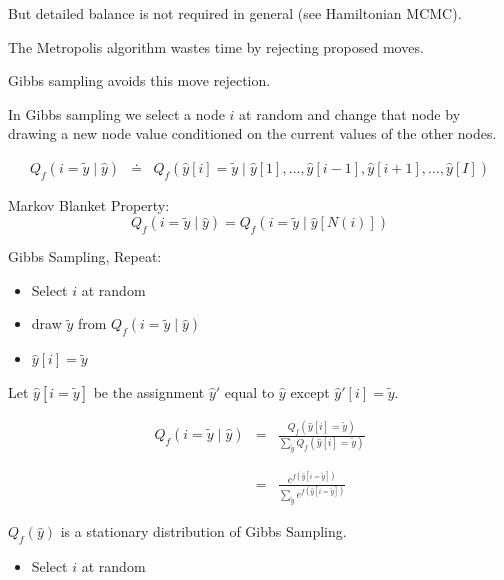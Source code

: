 {\vfill
But detailed balance is not required in general (see Hamiltonian MCMC).


The Metropolis algorithm wastes time by rejecting proposed moves.

\vfill
Gibbs sampling avoids this move rejection.

\vfill
In Gibbs sampling we select a node $i$ at random and change that node by drawing a new node value conditioned on the current values of the other nodes.


\begin{eqnarray*}
  Q_f(i=\tilde{y} \;|\;\hat{y}) & \doteq & Q_f(\hat{y}[i] = \tilde{y}\;|\;\hat{y}[1],\ldots,\hat{y}[i-1],\hat{y}[i+1],\ldots,\hat{y}[I])
\end{eqnarray*}

\vfill
Markov Blanket Property:
$$Q_f(i=\tilde{y} \;|\;\hat{y}) = Q_f(i=\tilde{y} \;|\;\hat{y}[N(i)])$$
  
\vfill
Gibbs Sampling, Repeat:

\begin{itemize}
\item   Select $i$ at random

\item draw $\tilde{y}$ from $Q_f(i = \tilde{y} \;|\;\hat{y})$

\item $\hat{y}[i] = \tilde{y}$
\end{itemize}


Let $\hat{y}[i = \tilde{y}]$ be the assignment $\hat{y}'$ equal to $\hat{y}$ except $\hat{y}'[i] = \tilde{y}$.

\vfill
\begin{eqnarray*}
 Q_f(i = \tilde{y} \;|\; \hat{y})  & = & \frac{Q_f(\hat{y}[i] = \tilde{y})}{\sum_{\tilde{y}} Q_f(\hat{y}[i] = \tilde{y})} \\
  \\
  \\
  & = & \frac{e^{f(\hat{y}[i = \tilde{y}])}}{\sum_{\tilde{y}} e^{f(\hat{y}[i = \tilde{y}])}}
\end{eqnarray*}


$Q_f(\hat{y})$ is a stationary distribution of Gibbs Sampling.

\vfill
\begin{itemize}
\item   Select $i$ at random


\end{itemize}}
